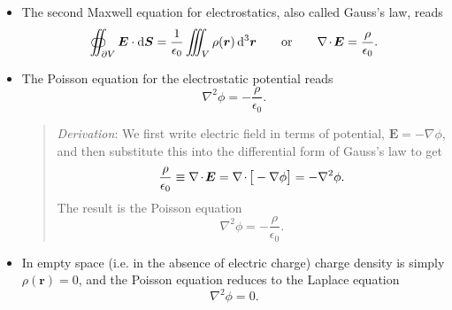 \documentclass[11pt, a4paper]{article}
\newcommand{\diff}{\mathop{}\!\mathrm{d}} %
\newcommand{\dr}{\diff^{3} \r}  %
\renewcommand{\vec}[1]{\bm{#1}} %
\renewcommand{\r}{\vec{r}}
\newcommand{\E}{\vec{E}} %
\newcommand{\ee}{\epsilon_{0}}  %
\renewcommand{\div}{\nabla \mspace{-2mu} \cdot \mspace{-2mu}}
\renewcommand{\grad}{\nabla}
\renewcommand{\laplacian}{\nabla^{2}}
\begin{document}
\begin{itemize}

    \item The second Maxwell equation for electrostatics, also called Gauss's law, reads
    \begin{equation*}
        \oiint_{\partial V} \E \cdot \diff \vec{S} = \frac{1}{\ee} \iiint_{V} \rho(\r)\dr \qquad \text{or} \qquad \div \E = \frac{\rho}{\ee}.
    \end{equation*}

    \item The Poisson equation for the electrostatic potential reads
    \begin{equation*}
        \laplacian \phi = - \frac{\rho}{\ee}.
    \end{equation*}
    \begin{quote}
        \textit{Derivation}: We first write electric field in terms of potential, $ \E = - \grad \phi $, and then substitute this into the differential form of Gauss's law to get
        \begin{equation*}
            \frac{\rho}{\ee} \equiv \div \E = \div \big[- \grad \phi \big]= - \laplacian \phi.
        \end{equation*}
        The result is the Poisson equation
        \begin{equation*}
            \laplacian \phi = - \frac{\rho}{\ee}.
        \end{equation*}
    \end{quote}
    
    \item In empty space (i.e. in the absence of electric charge) charge density is simply $ \rho(\r) = 0 $, and the Poisson equation reduces to the Laplace equation
    \begin{equation*}
        \laplacian \phi = 0.
    \end{equation*}
    
\end{itemize}
\end{document}
